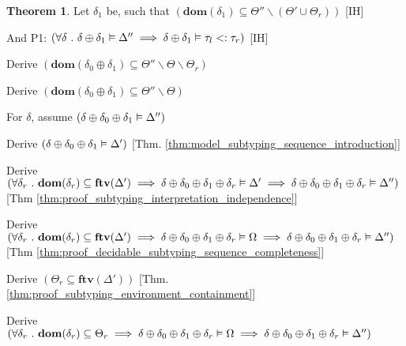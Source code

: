 \documentclass[acmsmall]{acmart}
\theoremstyle{definition}
\newtheorem{theorem}{Theorem}[section]
\begin{document}
\begin{theorem}
  \item \I \N Let $\delta_1$ be, such that $(
    \textbf{dom}(\delta_1) \subseteq \Theta'' \backslash (\Theta' \cup \Theta_r)
  )$ [IH]

  \item \I \N And P1: $(
    \forall \delta \ .\ 
    \delta \oplus \delta_1 \vDash \Delta''
    \implies
    \delta \oplus \delta_1 \vDash \tau_l <: \tau_r
  )$ [IH]

  \item \I \N Derive $(
    \textbf{dom}(\delta_0 \oplus \delta_1) \subseteq \Theta'' \backslash \Theta \backslash \Theta_r
  )$

  \item \I \N Derive $(
    \textbf{dom}(\delta_0 \oplus \delta_1) \subseteq \Theta'' \backslash \Theta
  )$

  \item \I \N For $\delta$, assume $(
    \delta \oplus \delta_0 \oplus \delta_1 \vDash \Delta''
  )$ 

  \item \I\I \N Derive $(
    \delta \oplus \delta_0 \oplus \delta_1 \vDash \Delta'
  )$ [Thm. \ref{thm:model_subtyping_sequence_introduction}]

  \item \I\I \N Derive $(
    \forall \delta_r \ .\ 
    \textbf{dom}(\delta_r) \subseteq \textbf{ftv}(\Delta')
    \implies
    \delta \oplus \delta_0 \oplus \delta_1 \oplus \delta_r \vDash \Delta' 
    \implies
    \delta \oplus \delta_0 \oplus \delta_1 \oplus \delta_r \vDash \Delta''
  )$ [Thm \ref{thm:proof_subtyping_interpretation_independence}]


  \item \I\I \N Derive $(
    \forall \delta_r \ .\ 
    \textbf{dom}(\delta_r) \subseteq \textbf{ftv}(\Delta')
    \implies
    \delta \oplus \delta_0 \oplus \delta_1 \oplus \delta_r \vDash \Omega 
    \implies
    \delta \oplus \delta_0 \oplus \delta_1 \oplus \delta_r \vDash \Delta''
  )$ [Thm \ref{thm:proof_decidable_subtyping_sequence_completeness}]

  \item \I\I \N Derive $(
    \Theta_r \subseteq \textbf{ftv}(\Delta')
  )$ [Thm. \ref{thm:proof_subtyping_environment_containment}]

  \item \I\I \N Derive $(
    \forall \delta_r \ .\ 
    \textbf{dom}(\delta_r) \subseteq \Theta_r 
    \implies
    \delta \oplus \delta_0 \oplus \delta_1 \oplus \delta_r \vDash \Omega
    \implies
    \delta \oplus \delta_0 \oplus \delta_1 \oplus \delta_r \vDash \Delta''
  )$ 


\end{theorem}
\end{document}
